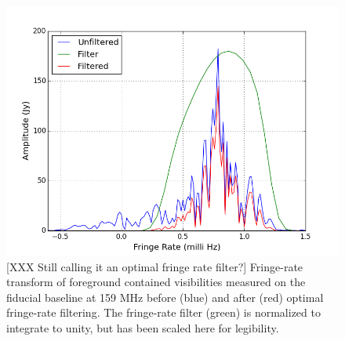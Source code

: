\documentclass[twocolumn,numberedappendix]{emulateapj} \shorttitle{PSA64}
\begin{document}
\begin{figure}\centering
\includegraphics[width=\columnwidth]{plots/fr_preserved_signal.png}
\caption{
[XXX Still calling it an optimal fringe rate filter?]
Fringe-rate transform of foreground contained visibilities measured on the fiducial baseline at 159 MHz before (blue) and
after (red) optimal fringe-rate filtering. The fringe-rate filter (green) is normalized
to integrate to unity, but has been scaled here for legibility.
}
\label{fig:fr_preserved_signal}
\end{figure}
\end{document}
